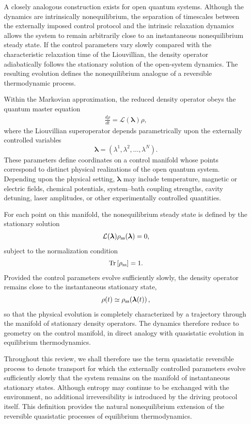 A closely analogous construction exists for open quantum systems.
Although the dynamics are intrinsically nonequilibrium, the
separation of timescales between the externally imposed control
protocol and the intrinsic relaxation dynamics allows the system
to remain arbitrarily close to an instantaneous nonequilibrium
steady state. If the control parameters vary slowly compared with
the characteristic relaxation time of the Liouvillian, the
density operator adiabatically follows the stationary solution of
the open-system dynamics. The resulting evolution defines the
nonequilibrium analogue of a reversible thermodynamic process.

Within the Markovian approximation, the reduced density operator
obeys the quantum master equation
\begin{align}
\frac{d\rho}{dt}
=
\mathcal{L}(\bm{\lambda})\rho,
\end{align}
where the Liouvillian superoperator depends parametrically upon
the externally controlled variables
\[
\bm{\lambda}
=
(\lambda^1,\lambda^2,\ldots,\lambda^N).
\]
These parameters define coordinates on a control manifold whose
points correspond to distinct physical realizations of the open
quantum system. Depending upon the physical setting,
\(\bm{\lambda}\) may include temperature, magnetic or electric
fields, chemical potentials, system--bath coupling strengths,
cavity detuning, laser amplitudes, or other experimentally
controlled quantities.

For each point on this manifold, the nonequilibrium steady state
is defined by the stationary solution
\begin{align}
\mathcal{L}(\bm{\lambda})
\rho_{\rm ss}(\bm{\lambda})
=
0,
\end{align}
subject to the normalization condition
\[
\mathrm{Tr}
\left[
\rho_{\rm ss}
\right]
=
1.
\]
Provided the control parameters evolve sufficiently slowly, the
density operator remains close to the instantaneous stationary
state,
\begin{align}
\rho(t)
\simeq
\rho_{\rm ss}
\!\left(
\bm{\lambda}(t)
\right),
\end{align}
so that the physical evolution is completely characterized by a
trajectory through the manifold of stationary density operators.
The dynamics therefore reduce to geometry on the control
manifold, in direct analogy with quasistatic evolution in
equilibrium thermodynamics.

Throughout this review, we shall therefore use the term quasistatic reversible process to denote transport for which the externally controlled parameters evolve sufficiently slowly that the system remains on the manifold of instantaneous stationary states. Although entropy may continue to be exchanged with the environment, no additional irreversibility is introduced by the driving protocol itself. This definition provides the natural nonequilibrium extension of the reversible quasistatic processes of equilibrium thermodynamics.

